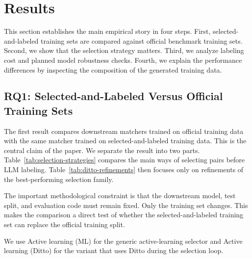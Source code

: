 \section{Results}

This section establishes the main empirical story in four steps. First, selected-and-labeled training sets are compared against official benchmark training sets. Second, we show that the selection strategy matters. Third, we analyze labeling cost and planned model robustness checks. Fourth, we explain the performance differences by inspecting the composition of the generated training data.

\subsection{RQ1: Selected-and-Labeled Versus Official Training Sets}

The first result compares downstream matchers trained on official training data with the same matcher trained on selected-and-labeled training data. This is the central claim of the paper. We separate the result into two parts. Table~\ref{tab:selection-strategies} compares the main ways of selecting pairs before LLM labeling. Table~\ref{tab:ditto-refinements} then focuses only on refinements of the best-performing selection family.

The important methodological constraint is that the downstream model, test split, and evaluation code must remain fixed. Only the training set changes. This makes the comparison a direct test of whether the selected-and-labeled training set can replace the official training split.

We use Active learning (ML) for the generic active-learning selector and Active learning (Ditto) for the variant that uses Ditto during the selection loop.

